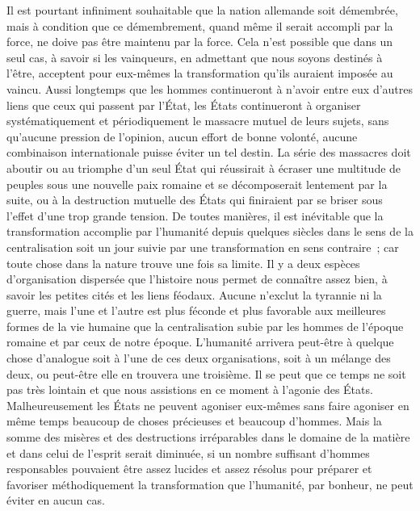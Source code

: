 \documentclass[french,twoside]{book} %
\begin{document}
Il est pourtant infiniment souhaitable que la nation allemande soit démem­brée, mais à condition que ce démembrement, quand même il serait accompli par la force, ne doive pas être maintenu par la force. Cela n'est possible que dans un seul cas, à savoir si les vainqueurs, en admettant que nous soyons destinés à l'être, acceptent pour eux-mêmes la transformation qu'ils auraient imposée au vaincu. Aussi longtemps que les hommes continueront à n'avoir entre eux d'autres liens que ceux qui passent par l'État, les États continueront à organiser systématiquement et périodiquement le massacre mutuel de leurs sujets, sans qu'aucune pression de l'opinion, aucun effort de bonne volonté, aucune combinaison internationale puisse éviter un tel destin. La série des massacres doit aboutir ou au triomphe d'un seul État qui réussirait à écraser une multitude de peuples sous une nouvelle paix romaine et se décomposerait lentement par la suite, ou à la destruction mutuelle des États qui finiraient par se briser sous l'effet d'une trop grande tension. De toutes manières, il est inévitable que la transformation accomplie par l'humanité depuis quelques siècles dans le sens de la centralisation soit un jour suivie par une transfor­mation en sens contraire ; car toute chose dans la nature trouve une fois sa limite. Il y a deux espèces d'organisation dispersée que l'histoire nous permet de connaître assez bien, à savoir les petites cités et les liens féodaux. Aucune n'exclut la tyrannie ni la guerre, mais l'une et l'autre est plus féconde et plus favorable aux meilleures formes de la vie humaine que la centralisation subie par les hommes de l'époque romaine et par ceux de notre époque. L'humanité arrivera peut-être à quelque chose d'analogue soit à l'une de ces deux organisations, soit à un mélange des deux, ou peut-être elle en trouvera une troisième. Il se peut que ce temps ne soit pas très lointain et que nous assis­tions en ce moment à l'agonie des États. Malheureusement les États ne peuvent agoniser eux-mêmes sans faire agoniser en même temps beaucoup de choses précieuses et beaucoup d'hommes. Mais la somme des misères et des destructions irréparables dans le domaine de la matière et dans celui de l'esprit serait diminuée, si un nombre suffisant d'hommes responsables pouvaient être assez lucides et assez résolus pour préparer et favoriser méthodiquement la transformation que l'humanité, par bonheur, ne peut éviter en aucun cas.\par

\begin{center}
\noindent \centerline{}
\end{center}
\end{document}
